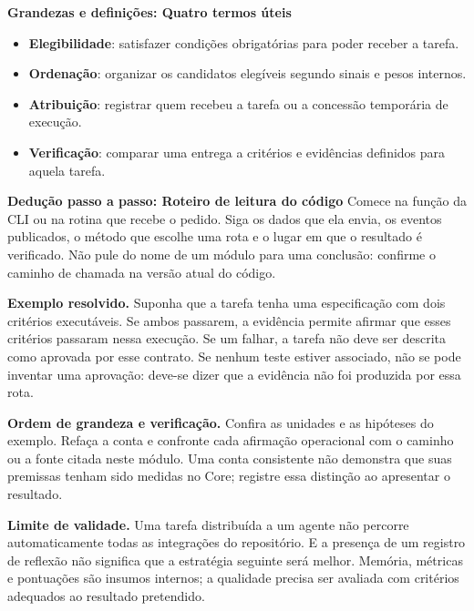 \begin{definicao}
\textbf{Grandezas e definições: Quatro termos úteis}
\begin{itemize}[leftmargin=1.3em,itemsep=1pt]
  \item \textbf{Elegibilidade}: satisfazer condições obrigatórias para poder
        receber a tarefa.
  \item \textbf{Ordenação}: organizar os candidatos elegíveis segundo sinais e
        pesos internos.
  \item \textbf{Atribuição}: registrar quem recebeu a tarefa ou a concessão
        temporária de execução.
  \item \textbf{Verificação}: comparar uma entrega a critérios e evidências
        definidos para aquela tarefa.
\end{itemize}
\end{definicao}

\begin{metodo}
\textbf{Dedução passo a passo: Roteiro de leitura do código}  Comece na função da CLI ou na rotina que
recebe o pedido. Siga os dados que ela envia, os eventos publicados, o método
que escolhe uma rota e o lugar em que o resultado é verificado. Não pule do
nome de um módulo para uma conclusão: confirme o caminho de chamada na versão
atual do código.
\end{metodo}

\begin{resultado}
\textbf{Exemplo resolvido.} Suponha que a tarefa tenha uma especificação com
dois critérios executáveis. Se ambos passarem, a evidência permite afirmar que
esses critérios passaram nessa execução. Se um falhar, a tarefa não deve ser
descrita como aprovada por esse contrato. Se nenhum teste estiver associado,
não se pode inventar uma aprovação: deve-se dizer que a evidência não foi
produzida por essa rota.
\end{resultado}

\begin{resultado}
\textbf{Ordem de grandeza e verificação.} Confira as unidades e as hipóteses
do exemplo. Refaça a conta e confronte cada afirmação operacional com o caminho
ou a fonte citada neste módulo. Uma conta consistente não demonstra que suas
premissas tenham sido medidas no Core; registre essa distinção ao apresentar o resultado.
\end{resultado}

\begin{aviso}
\textbf{Limite de validade.} Uma tarefa distribuída a um agente não percorre automaticamente todas as
integrações do repositório. E a presença de um registro de reflexão não significa
que a estratégia seguinte será melhor. Memória, métricas e pontuações são
insumos internos; a qualidade precisa ser avaliada com critérios adequados ao
resultado pretendido.
\end{aviso}

